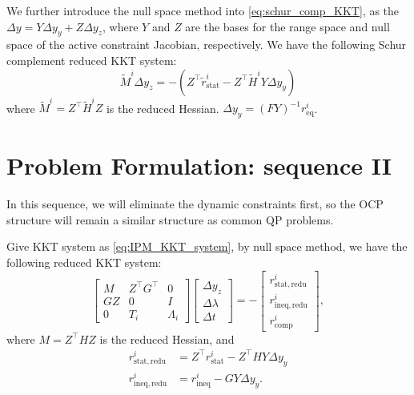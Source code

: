 \documentclass[conference]{IEEEtran}
\theoremstyle{plain}
\begin{document}
We further introduce the null space method into \ref{eq:schur_comp_KKT}, as the $\Delta y = Y\Delta y_y + Z\Delta y_z$, 
where $Y$ and $Z$ are the bases for the range space and null space of the active constraint Jacobian, respectively. We have the following Schur complement reduced KKT system:
\begin{equation}
    \tilde{M}^i \Delta y_z = - (Z^\top \tilde{r}_{\mathrm{stat}}^i - Z^\top \tilde{H}^i Y \Delta y_y)
    \label{eq:schur_comp_KKT_reduced}
\end{equation}
where $\tilde{M}^i = Z^\top \tilde{H}^i Z$ is the reduced Hessian. $\Delta y_y = (FY)^{-1}r_{\mathrm{eq}}^i$.

\section{Problem Formulation: sequence II}
In this sequence, we will eliminate the dynamic constraints first, so the OCP structure will remain a similar structure as common QP problems.

Give KKT system as \ref{eq:IPM_KKT_system}, by null space method, we have the following reduced KKT system:
\begin{equation}
    \begin{bmatrix}
    M & Z^\top G^\top & 0\\
    GZ & 0 & I \\
    0 & T_i & \Lambda_i
    \end{bmatrix}
    \begin{bmatrix}
    \Delta y_z \\
    \Delta \lambda \\
    \Delta t
    \end{bmatrix} = -
    \begin{bmatrix}
    r_{\mathrm{stat, redu}}^i \\
    r_{\mathrm{ineq, redu}}^i \\
    r_{\mathrm{comp}}^i
    \end{bmatrix},
    \label{eq:reduced_KKT_system}
\end{equation}
where $M = Z^\top H Z$ is the reduced Hessian, and
\begin{align*}
    r_{\mathrm{stat, redu}}^i &= Z^\top r_{\mathrm{stat}}^i - Z^\top H Y \Delta y_y \\
    r_{\mathrm{ineq, redu}}^i &=  r_{\mathrm{ineq}}^i - G Y \Delta y_y.
\end{align*}
\end{document}
